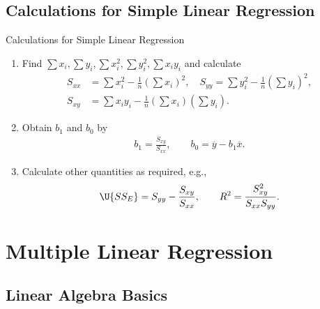 \subsection{Calculations for Simple Linear Regression}

\begin{frame}{Calculations for Simple Linear Regression}


\begin{enumerate}
	\justifying
	\item Find $\sum x_i, \sum y_i, \sum x_i^2, \sum y_i^2, \sum x_iy_i$ and calculate
	\begin{align*}
	S_{xx} & = \sum x_i^2 - \frac{1}{n}\left(\sum x_i \right)^2, \quad S_{yy} = \sum y_i^2 - \frac{1}{n}\left(\sum y_i \right)^2,\\
	S_{xy} & = \sum x_iy_i - \frac{1}{n}\left(\sum x_i \right)\left(\sum y_i \right).
	\end{align*}
	\item Obtain $b_1$ and $b_0$ by
	\begin{align*}
	b_1 = \frac{S_{xy}}{S_{xx}}, \qquad b_0 = \overline{y} - b_1\overline{x}.
	\end{align*}
	\item Calculate other quantities as required, e.g.,
	\begin{align*}
	\U{SS_E} = S_{yy} - \frac{S_{xy}}{S_{xx}}, \qquad R^2 = \frac{S_{xy}^2}{S_{xx}S_{yy}}.
	\end{align*}
\end{enumerate}


\end{frame}


\section{Multiple Linear Regression}


\subsection{Linear Algebra Basics}


